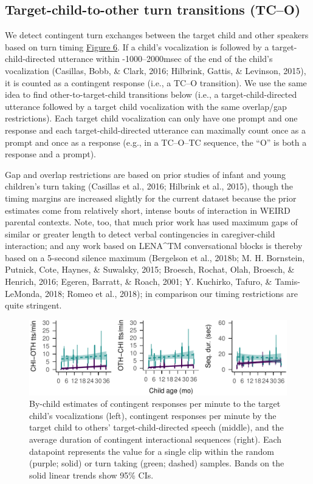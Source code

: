 \documentclass[floatsintext,man]{apa6}
\theoremstyle{definition}
\theoremstyle{definition}
\theoremstyle{definition}
\theoremstyle{remark}
\begin{document}
\subsection{Target-child-to-other turn transitions
(TC--O)}\label{target-child-to-other-turn-transitions-tco}

We detect contingent turn exchanges between the target child and other
speakers based on turn timing \protect\hyperlink{fig6}{Figure 6}. If a
child's vocalization is followed by a target-child-directed utterance
within -1000--2000msec of the end of the child's vocalization (Casillas,
Bobb, \& Clark, 2016; Hilbrink, Gattis, \& Levinson, 2015), it is
counted as a contingent response (i.e., a TC--O transition). We use the
same idea to find other-to-target-child transitions below (i.e., a
target-child-directed utterance followed by a target child vocalization
with the same overlap/gap restrictions). Each target child vocalization
can only have one prompt and one response and each target-child-directed
utterance can maximally count once as a prompt and once as a response
(e.g., in a TC--O--TC sequence, the \enquote{O} is both a response and a
prompt).

Gap and overlap restrictions are based on prior studies of infant and
young children's turn taking (Casillas et al., 2016; Hilbrink et al.,
2015), though the timing margins are increased slightly for the current
dataset because the prior estimates come from relatively short, intense
bouts of interaction in WEIRD parental contexts. Note, too, that much
prior work has used maximum gaps of similar or greater length to detect
verbal contingencies in caregiver-child interaction; and any work based
on LENA\^{}TM conversational blocks is thereby based on a 5-second
silence maximum (Bergelson et al., 2018b; M. H. Bornstein, Putnick,
Cote, Haynes, \& Suwalsky, 2015; Broesch, Rochat, Olah, Broesch, \&
Henrich, 2016; Egeren, Barratt, \& Roach, 2001; Y. Kuchirko, Tafuro, \&
Tamis-LeMonda, 2018; Romeo et al., 2018); in comparison our timing
restrictions are quite stringent.

\begin{figure}
\centering
\includegraphics{Tseltal-CLE_files/figure-latex/fig7-1.pdf}
\caption{\label{fig:fig7}By-child estimates of contingent responses per
minute to the target child's vocalizations (left), contingent responses
per minute by the target child to others' target-child-directed speech
(middle), and the average duration of contingent interactional sequences
(right). Each datapoint represents the value for a single clip within
the random (purple; solid) or turn taking (green; dashed) samples. Bands
on the solid linear trends show 95\% CIs.}
\end{figure}
\end{document}
